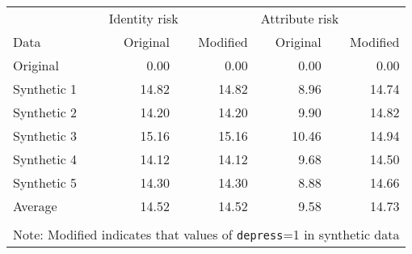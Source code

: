 \begin{tabular}{lrrrr}
   
\toprule & 
\multicolumn{2}{l}{Identity risk} &
\multicolumn{2}{l}{Attribute risk}
\\  
 
\cmidrule(lr){2-3}
\cmidrule(lr){4-5}
 
Data & Original & Modified & Original & Modified
\\ 

\midrule
Original & 0.00 & 0.00 & 0.00 & 0.00 \\ 
  Synthetic 1 & 14.82 & 14.82 & 8.96 & 14.74 \\ 
  Synthetic 2 & 14.20 & 14.20 & 9.90 & 14.82 \\ 
  Synthetic 3 & 15.16 & 15.16 & 10.46 & 14.94 \\ 
  Synthetic 4 & 14.12 & 14.12 & 9.68 & 14.50 \\ 
  Synthetic 5 & 14.30 & 14.30 & 8.88 & 14.66 \\ 
  Average & 14.52 & 14.52 & 9.58 & 14.73 \\ 
   \bottomrule \\[-1.8ex] \multicolumn{5}{p{2.5in}}{Note: Modified indicates that values of \texttt{depress}=1  in synthetic data} 
\end{tabular}
